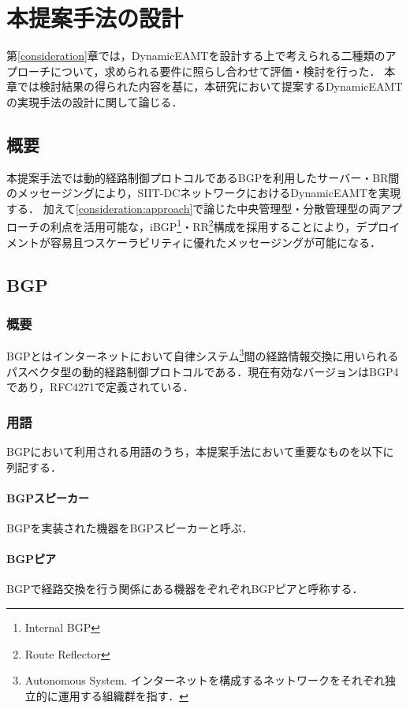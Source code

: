 \chapter{本提案手法の設計}
\label{proposal}
第\ref{consideration}章では，DynamicEAMTを設計する上で考えられる二種類のアプローチについて，求められる要件に照らし合わせて評価・検討を行った．
本章では検討結果の得られた内容を基に，本研究において提案するDynamicEAMTの実現手法の設計に関して論じる．

\section{概要}
本提案手法では動的経路制御プロトコルであるBGPを利用したサーバー・BR間のメッセージングにより，SIIT-DCネットワークにおけるDynamicEAMTを実現する．
加えて\ref{consideration:approach}で論じた中央管理型・分散管理型の両アプローチの利点を活用可能な，iBGP\footnote{Internal BGP}・RR\footnote{Route Reflector}構成を採用することにより，デプロイメントが容易且つスケーラビリティに優れたメッセージングが可能になる．

\section{BGP}
\subsection{概要}
BGPとはインターネットにおいて自律システム\footnote{Autonomous System. インターネットを構成するネットワークをそれぞれ独立的に運用する組織群を指す．}間の経路情報交換に用いられるパスベクタ型の動的経路制御プロトコルである．現在有効なバージョンはBGP4であり，RFC4271で定義されている\cite{RFC4271}．


\subsection{用語}
BGPにおいて利用される用語のうち，本提案手法において重要なものを以下に列記する．

\subsubsection{BGPスピーカー}
BGPを実装された機器をBGPスピーカーと呼ぶ．

\subsubsection{BGPピア}
BGPで経路交換を行う関係にある機器をぞれぞれBGPピアと呼称する．

